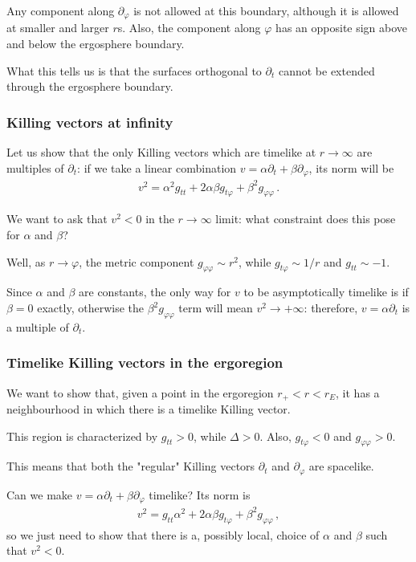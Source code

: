 \documentclass[main.tex]{subfiles}
\begin{document}
Any component along \(\partial_\varphi\) is not allowed at this boundary, although it is allowed at smaller and larger \(r\)s.
Also, the component along \(\varphi \) has an opposite sign above and below the ergosphere boundary. 

What this tells us is that the surfaces orthogonal to \(\partial_t\) cannot be extended through the ergosphere boundary.

\subsubsection{Killing vectors at infinity}

Let us show that the only Killing vectors which are timelike at \(r \to \infty \) are multiples of \(\partial_t\): if we take a linear combination \(v = \alpha \partial_t + \beta \partial_\varphi\), its norm will be 
%
\begin{align}
v^2 = \alpha^2 g_{tt} + 2 \alpha \beta g_{t \varphi } + \beta^2 g_{\varphi \varphi }
\,.
\end{align}

We want to ask that \(v^2 < 0\) in the \(r \to \infty \) limit: what constraint does this pose for \(\alpha \) and \(\beta \)? 

Well, as \(r \to \varphi \), the metric component \(g_{\varphi \varphi } \sim r^2 \), while \(g_{t \varphi } \sim 1 /r\) and \(g_{tt} \sim -1\).

Since \(\alpha\) and \(\beta\) are constants, the only way for \(v\) to be asymptotically timelike is if \(\beta = 0\) exactly, otherwise the \(\beta^2 g_{\varphi \varphi }\) term will mean \(v^2 \to + \infty \): therefore, \(v = \alpha \partial_t\) is a multiple of \(\partial_t\). 

\subsubsection{Timelike Killing vectors in the ergoregion}

We want to show that, given a point in the ergoregion \(r_+ < r < r_E\), it has a neighbourhood in which there is a timelike Killing vector.

This region is characterized by \(g_{tt} > 0\), while \(\Delta > 0\).
Also, \(g_{t \varphi } < 0\) and \(g_{\varphi \varphi } > 0\). 

This means that both the "regular" Killing vectors \(\partial_t\) and \(\partial_\varphi \) are spacelike. 

Can we make \(v = \alpha \partial_t + \beta \partial_\varphi \) timelike?
Its norm is 
%
\begin{align}
v^2 = g_{tt} \alpha^2 + 2 \alpha \beta g_{t \varphi } + \beta^2 g_{\varphi \varphi }
\,,
\end{align}
%
so we just need to show that there is a, possibly local, choice of \(\alpha \) and \(\beta \) such that \(v^2 < 0\).
\end{document}

